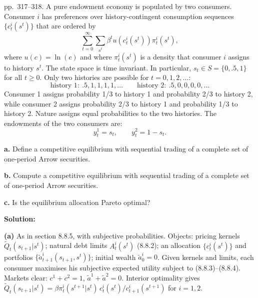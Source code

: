\documentclass[12pt, letterpaper]{article}
\begin{document}
\begin{tcolorbox}[oddbox,title={Exercise 8.15 \quad Diverse beliefs, I}]
\begin{tcolorbox}[questionbox]
pp.~317--318. A pure endowment economy is populated by two consumers. Consumer $i$ has preferences over
history-contingent consumption sequences $\{c^i_t(s^t)\}$ that are ordered by
\[
\sum_{t=0}^\infty\sum_{s^t}\beta^tu(c^i_t(s^t))\pi^i_t(s^t),
\]
where $u(c)=\ln(c)$ and where $\pi^i_t(s^t)$ is a density that consumer $i$ assigns to history $s^t$. The state
space is time invariant. In particular, $s_t\in S=\{0,.5,1\}$ for all $t\ge0$. Only two histories are possible for
$t=0,1,2,\dots$:
\[
\text{history 1}:\ .5,1,1,1,1,\dots\qquad\text{history 2}:\ .5,0,0,0,0,\dots
\]
Consumer 1 assigns probability 1/3 to history 1 and probability 2/3 to history 2, while consumer 2 assigns
probability 2/3 to history 1 and probability 1/3 to history 2. Nature assigns equal probabilities to the two
histories. The endowments of the two consumers are:
\[
y^1_t=s_t,\qquad y^2_t=1-s_t.
\]

\textbf{a.} Define a competitive equilibrium with sequential trading of a complete set of one-period Arrow
securities.

\textbf{b.} Compute a competitive equilibrium with sequential trading of a complete set of one-period Arrow
securities.

\textbf{c.} Is the equilibrium allocation Pareto optimal?
\end{tcolorbox}

\textbf{Solution:}

\textbf{(a)} As in section 8.8.5, with subjective probabilities. Objects: pricing kernels $\tilde Q_t(s_{t+1}|s^t)$;
natural debt limits $A^i_t(s^t)$ (8.8.2); an allocation $\{c^i_t(s^t)\}$ and portfolios $\{\tilde a^i_{t+1}(s_{t+1},s^t)\}$;
initial wealth $\tilde a^i_0=0$. Given kernels and limits, each consumer maximises his subjective expected utility subject to
(8.8.3)--(8.8.4). Markets clear: $c^1+c^2=1$, $\tilde a^1+\tilde a^2=0$. Interior optimality gives
$\tilde Q_t(s_{t+1}|s^t)=\beta\pi^i_t(s^{t+1}|s^t)\,c^i_t(s^t)/c^i_{t+1}(s^{t+1})$ for $i=1,2$.


\end{tcolorbox}
\end{document}
